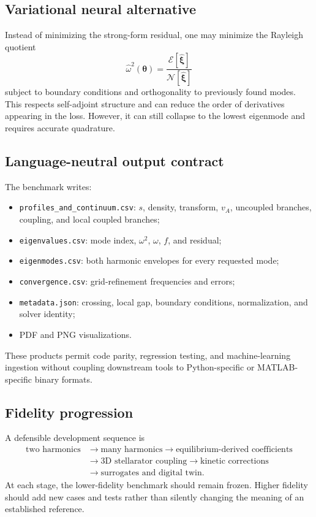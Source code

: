 \subsection{Variational neural alternative}
Instead of minimizing the strong-form residual, one may minimize the Rayleigh quotient
\begin{equation}
\widehat\omega^2(\boldsymbol\theta)
=\frac{\mathcal E[\widehat{\boldsymbol\xi}]}
{\mathcal N[\widehat{\boldsymbol\xi}]}
\end{equation}
subject to boundary conditions and orthogonality to previously found modes. This respects self-adjoint structure and can reduce the order of derivatives appearing in the loss. However, it can still collapse to the lowest eigenmode and requires accurate quadrature.

\subsection{Language-neutral output contract}
The benchmark writes:
\begin{itemize}[leftmargin=1.6em]
\item \texttt{profiles\_and\_continuum.csv}: $s$, density, transform, $v_A$, uncoupled branches, coupling, and local coupled branches;
\item \texttt{eigenvalues.csv}: mode index, $\omega^2$, $\omega$, $f$, and residual;
\item \texttt{eigenmodes.csv}: both harmonic envelopes for every requested mode;
\item \texttt{convergence.csv}: grid-refinement frequencies and errors;
\item \texttt{metadata.json}: crossing, local gap, boundary conditions, normalization, and solver identity;
\item PDF and PNG visualizations.
\end{itemize}
These products permit code parity, regression testing, and machine-learning ingestion without coupling downstream tools to Python-specific or MATLAB-specific binary formats.

\subsection{Fidelity progression}
A defensible development sequence is
\begin{equation}
\begin{aligned}
\text{two harmonics}
&\rightarrow \text{many harmonics}
\rightarrow \text{equilibrium-derived coefficients}\\
&\rightarrow \text{3D stellarator coupling}
\rightarrow \text{kinetic corrections}\\
&\rightarrow \text{surrogates and digital twin}.
\end{aligned}
\end{equation}
At each stage, the lower-fidelity benchmark should remain frozen. Higher fidelity should add new cases and tests rather than silently changing the meaning of an established reference.
